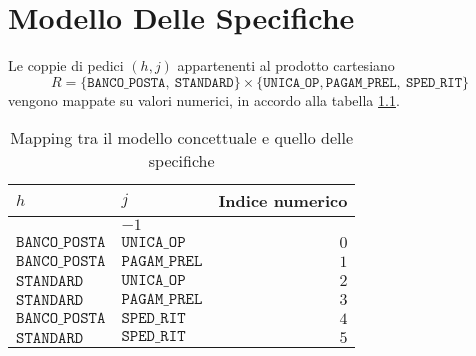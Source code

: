 \chapter{Modello Delle Specifiche}\label{chp:modello-specifiche}
Le coppie di pedici $(h,j)$ appartenenti al prodotto cartesiano 
\begin{equation}
R = \lbrace \mathtt{BANCO\_POSTA},\ \mathtt{STANDARD}\rbrace \times \lbrace \mathtt{UNICA\_OP},\mathtt{PAGAM\_PREL},\ \mathtt{SPED\_RIT} \rbrace
\end{equation}
vengono mappate su valori numerici, in accordo alla tabella \ref{table:modello-specifiche-1}.
\begin{table}[ht]
\centering
{\tablecolors
\begin{tabular}{| l | l | r |}
\hline
$h$ & $j$ & Indice numerico\\
\hline
\rowcolor{airforceblue!50}
\multicolumn{2}{| c |}{$\mathtt{IDLE}$} & $-1$\\
\hline
$\mathtt{BANCO\_POSTA}$ & $\mathtt{UNICA\_OP}$ & $0$\\
\hline
$\mathtt{BANCO\_POSTA}$ & $\mathtt{PAGAM\_PREL}$ & $1$\\
\hline
$\mathtt{STANDARD}$ & $\mathtt{UNICA\_OP}$ & $2$\\
\hline
$\mathtt{STANDARD}$ & $\mathtt{PAGAM\_PREL}$ & $3$\\
\hline
$\mathtt{BANCO\_POSTA}$ & $\mathtt{SPED\_RIT}$ & $4$\\
\hline
$\mathtt{STANDARD}$ & $\mathtt{SPED\_RIT}$ & $5$\\
\hline
\end{tabular}}
\caption{Mapping tra il modello concettuale e quello delle specifiche}
\label{table:modello-specifiche-1}
\end{table}

